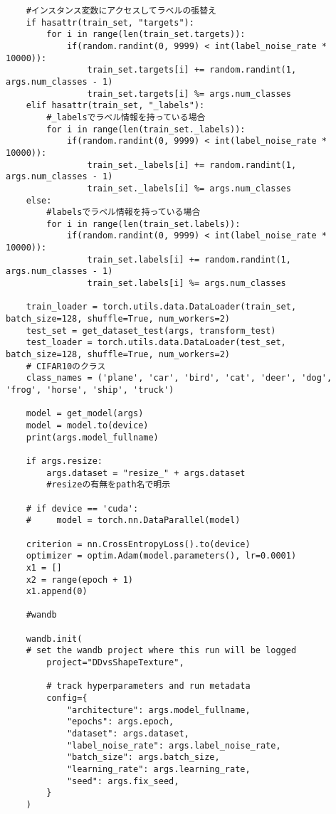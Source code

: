 {\begin{verbatim}
    #インスタンス変数にアクセスしてラベルの張替え
    if hasattr(train_set, "targets"):
        for i in range(len(train_set.targets)):
            if(random.randint(0, 9999) < int(label_noise_rate * 10000)):
                train_set.targets[i] += random.randint(1, args.num_classes - 1)
                train_set.targets[i] %= args.num_classes
    elif hasattr(train_set, "_labels"):
        #_labelsでラベル情報を持っている場合
        for i in range(len(train_set._labels)):
            if(random.randint(0, 9999) < int(label_noise_rate * 10000)):
                train_set._labels[i] += random.randint(1, args.num_classes - 1)
                train_set._labels[i] %= args.num_classes
    else:
        #labelsでラベル情報を持っている場合
        for i in range(len(train_set.labels)):
            if(random.randint(0, 9999) < int(label_noise_rate * 10000)):
                train_set.labels[i] += random.randint(1, args.num_classes - 1)
                train_set.labels[i] %= args.num_classes
    
    train_loader = torch.utils.data.DataLoader(train_set, batch_size=128, shuffle=True, num_workers=2)
    test_set = get_dataset_test(args, transform_test)
    test_loader = torch.utils.data.DataLoader(test_set, batch_size=128, shuffle=True, num_workers=2)
    # CIFAR10のクラス
    class_names = ('plane', 'car', 'bird', 'cat', 'deer', 'dog', 'frog', 'horse', 'ship', 'truck')
    
    model = get_model(args)
    model = model.to(device)
    print(args.model_fullname)

    if args.resize:
        args.dataset = "resize_" + args.dataset
        #resizeの有無をpath名で明示 

    # if device == 'cuda':
    #     model = torch.nn.DataParallel(model)

    criterion = nn.CrossEntropyLoss().to(device)
    optimizer = optim.Adam(model.parameters(), lr=0.0001)
    x1 = []
    x2 = range(epoch + 1)
    x1.append(0)

    #wandb

    wandb.init(
    # set the wandb project where this run will be logged
        project="DDvsShapeTexture",
        
        # track hyperparameters and run metadata
        config={
            "architecture": args.model_fullname,
            "epochs": args.epoch,
            "dataset": args.dataset,
            "label_noise_rate": args.label_noise_rate,
            "batch_size": args.batch_size,
            "learning_rate": args.learning_rate,
            "seed": args.fix_seed,
        }
    )



\end{verbatim}}
